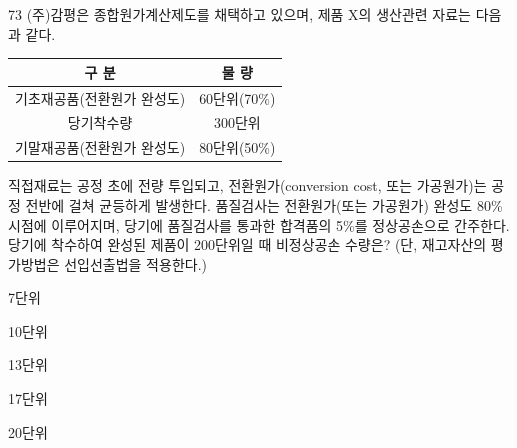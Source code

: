 \begin{question}{73}
(주)감평은 종합원가계산제도를 채택하고 있으며, 제품 X의 생산관련 자료는 다음과 같다.
\par{\small\centering\begin{tabular}{|c|c|}\hline
구 분 & 물 량 \tabularnewline\hline
기초재공품(전환원가 완성도) & 60단위(70\%) \tabularnewline\hline
당기착수량 & 300단위 \tabularnewline\hline
기말재공품(전환원가 완성도) & 80단위(50\%) \tabularnewline\hline
\end{tabular}\par}
직접재료는 공정 초에 전량 투입되고, 전환원가(conversion cost, 또는 가공원가)는 공정 전반에 걸쳐 균등하게 발생한다. 품질검사는 전환원가(또는 가공원가) 완성도 80\% 시점에 이루어지며, 당기에 품질검사를 통과한 합격품의 5\%를 정상공손으로 간주한다. 당기에 착수하여 완성된 제품이 200단위일 때 비정상공손 수량은? (단, 재고자산의 평가방법은 선입선출법을 적용한다.)
\begin{choices}
  \item 7단위
  \item 10단위
  \item 13단위
  \item 17단위
  \item 20단위
\end{choices}
\end{question}
